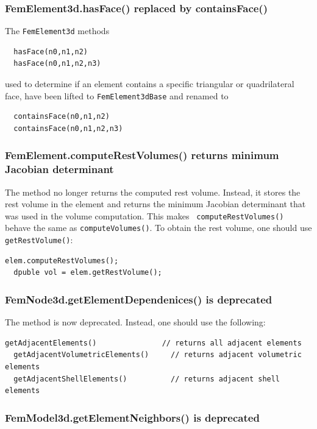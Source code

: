 \documentclass{article}
\begin{document}
\subsubsection*{FemElement3d.hasFace() replaced by containsFace()}

The {\tt FemElement3d} methods 
%
\begin{lstlisting}
  hasFace(n0,n1,n2)
  hasFace(n0,n1,n2,n3)
\end{lstlisting}
%
used to determine if an element contains a
specific triangular or quadrilateral face, have been lifted
to {\tt FemElement3dBase} and renamed to
%
\begin{lstlisting}
  containsFace(n0,n1,n2)
  containsFace(n0,n1,n2,n3)
\end{lstlisting}
%

\subsubsection*{FemElement.computeRestVolumes() returns
minimum Jacobian determinant}

The method
no longer returns the computed rest volume. Instead, it stores the
rest volume in the element and returns the minimum Jacobian
determinant that was used in the volume computation. This makes {\tt
computeRestVolumes()} behave the same as {\tt computeVolumes()}. To
obtain the rest volume, one should use {\tt getRestVolume()}:
%
\begin{lstlisting}[]
  elem.computeRestVolumes();
  dpuble vol = elem.getRestVolume();
\end{lstlisting}
%

\subsubsection*{FemNode3d.getElementDependenices() is deprecated}

The method
is now deprecated. Instead, one should use the following:

%
\begin{lstlisting}[]
  getAdjacentElements()               // returns all adjacent elements
  getAdjacentVolumetricElements()     // returns adjacent volumetric elements
  getAdjacentShellElements()          // returns adjacent shell elements
\end{lstlisting}
%

\subsubsection*{FemModel3d.getElementNeighbors() is deprecated}
\end{document}
